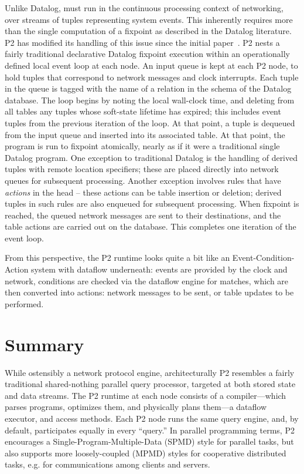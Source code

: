 Unlike Datalog, \OVERLOG must run in the continuous processing context of
networking, over streams of tuples representing system events.  This inherently
requires more than the single computation of a fixpoint as described in the
Datalog literature.  P2 has modified its handling of this issue since the
initial paper~\cite{p2:sosp}.  P2 nests a fairly traditional declarative
Datalog fixpoint execution within an operationally defined local event loop at
each node.  An input queue is kept at each P2 node, to hold tuples that
correspond to network messages and clock interrupts.  Each tuple in the queue
is tagged with the name of a relation in the schema of the Datalog database.
The loop begins by noting the local wall-clock time, and deleting from all
tables any tuples whose soft-state lifetime has expired; this includes event
tuples from the previous iteration of the loop.  At that point, a tuple is
dequeued from the input queue and inserted into its associated table.  At that
point, the \OVERLOG program is run to fixpoint atomically, nearly as if it were
a traditional single Datalog program.  One exception to traditional Datalog is
the handling of derived tuples with remote location specifiers; these are
placed directly into network queues for subsequent processing.  Another
exception involves rules that have {\em actions} in the head -- these actions
can be table insertion or deletion; derived tuples in such rules are also
enqueued for subsequent processing.  When fixpoint is reached, the queued
network messages are sent to their destinations, and the table actions are
carried out on the database.  This completes one iteration of the event loop.

From this perspective, the P2 runtime looks quite a bit like an
Event-Condition-Action system with dataflow underneath: events are provided by
the clock and network, conditions are checked via the dataflow engine for
matches, which are then converted into actions: network messages to be sent, or
table updates to be performed.

\section{Summary}

While ostensibly a network protocol engine, architecturally P2 resembles a
fairly traditional shared-nothing parallel query processor, targeted at both
stored state and data streams.  The P2 runtime at each node consists of a
compiler---which parses programs, optimizes them, and physically plans them---a
dataflow executor, and access methods.  Each P2 node runs the same query
engine, and, by default, participates equally in every ``query.'' In parallel
programming terms, P2 encourages a Single-Program-Multiple-Data (SPMD) style
for parallel tasks, but also supports more loosely-coupled (MPMD) styles for
cooperative distributed tasks, e.g.  for communications among clients and
servers.


